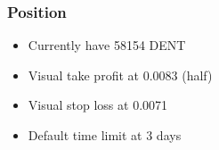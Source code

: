 \documentclass{../notes}
\begin{document}
\subsubsection{Position}
\begin{itemize}
  \item Currently have 58154 DENT
  \item Visual take profit at 0.0083 (half)
  \item Visual stop loss at 0.0071
  \item Default time limit at 3 days
\end{itemize}
\end{document}
